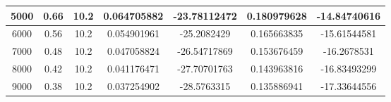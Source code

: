 \documentclass[a4paper,11pt]{jsarticle}
\begin{document}
\begin{center}
\begin{longtable}{|c|c|c|c|c|c|c|}
    5000                & 0.66      & 10.2     & 0.064705882 & -23.78112472 & 0.180979628 & -14.84740616 \\ \hline
    6000                & 0.56      & 10.2     & 0.054901961 & -25.2082429  & 0.165663835 & -15.61544581 \\ \hline
    7000                & 0.48      & 10.2     & 0.047058824 & -26.54717869 & 0.153676459 & -16.2678531  \\ \hline
    8000                & 0.42      & 10.2     & 0.041176471 & -27.70701763 & 0.143963816 & -16.83493299 \\ \hline
    9000                & 0.38      & 10.2     & 0.037254902 & -28.5763315  & 0.135886941 & -17.33644556 \\ \hline
  \end{longtable}
\end{center}
\end{document}
